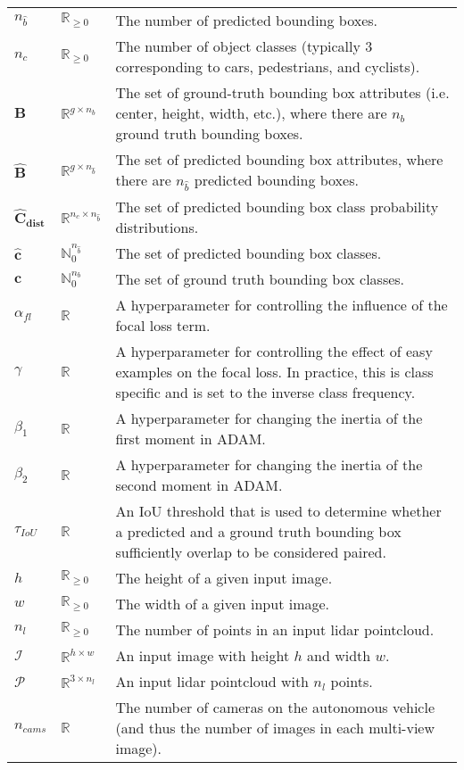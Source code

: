 \documentclass[12pt, titlepage]{article}
\begin{document}
\begin{longtable*}{l l p{12cm}}
\\
$n_{\hat{b}}$ & $\mathbb{R}_{\geq0}$ & The number of predicted bounding boxes. 
\\
$n_{c}$ & $\mathbb{R}_{\geq0}$ & The number of object classes (typically 3 corresponding to cars, pedestrians, and cyclists). 
\\
$\mathbf{B}$ & $\mathbb{R}^{g\times{}n_b}$ & The set of ground-truth bounding box attributes (i.e. center, height, width, etc.), where there are $n_b$ ground truth bounding boxes.
\\
$\mathbf{\hat{B}}$ & $\mathbb{R}^{g\times{}n_{\hat{b}}}$ & The set of predicted bounding box attributes, where there are $n_{\hat{b}}$ predicted bounding boxes.
\\
$\mathbf{\hat{C}_{\text{dist}}}$ & $\mathbb{R}^{n_c\times{}n_{\hat{b}}}$ & The set of predicted bounding box class probability distributions.
\\
$\mathbf{\hat{c}}$ & $\mathbb{N}_{0}^{n_{\hat{b}}}$ & The set of predicted bounding box classes.
\\
$\mathbf{c}$ & $\mathbb{N}_{0}^{n_b}$ & The set of ground truth bounding box classes.
\\
$\alpha_{fl}$ & $\mathbb{R}$ & A hyperparameter for controlling the influence of the focal loss term.
\\
$\gamma$ & $\mathbb{R}$ & A hyperparameter for controlling the effect of easy examples on the focal loss. In practice, this is class specific and is set to the inverse class frequency.
\\
$\beta_1$ & $\mathbb{R}$ & A hyperparameter for changing the inertia of the first moment in ADAM.
\\
$\beta_2$ & $\mathbb{R}$ & A hyperparameter for changing the inertia of the second moment in ADAM.
\\
$\tau_{IoU}$ & $\mathbb{R}$ & An IoU threshold that is used to determine whether a predicted and a ground truth bounding box sufficiently overlap to be considered paired.
\\
$h$ & $\mathbb{R}_{\geq0}$ & The height of a given input image. 
\\
$w$ & $\mathbb{R}_{\geq0}$ & The width of a given input image. 
\\
$n_{l}$ & $\mathbb{R}_{\geq0}$ & The number of points in an input lidar pointcloud. 
\\
$\mathcal{I}$ & $\mathbb{R}^{h\times{}w}$ & An input image with height $h$ and width $w$.
\\
$\mathcal{P}$ & $\mathbb{R}^{3\times{}n_l}$ & An input lidar pointcloud with $n_l$ points.
\\
$n_{cams}$ & $\mathbb{R}$ & The number of cameras on the autonomous vehicle (and thus the number of images in each multi-view image).
\\
\bottomrule
\end{longtable*}
\end{document}
